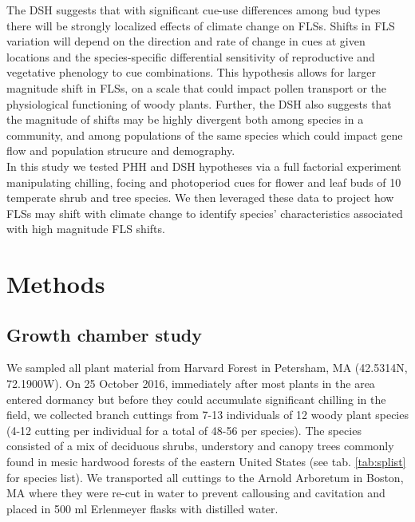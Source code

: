 \documentclass[11pt]{article}\usepackage[]{graphicx}\usepackage[]{color}
\begin{document}
\noindent The DSH suggests that with significant cue-use differences among bud types there will be strongly localized effects of climate change on FLSs. Shifts in FLS variation will depend on the direction and rate of change in cues at given locations and the species-specific differential sensitivity of reproductive and vegetative phenology to cue combinations. This hypothesis allows for larger magnitude shift in FLSs, on a scale that could impact pollen transport or the physiological functioning of woody plants. Further, the DSH also suggests that the magnitude of shifts may be highly divergent both among species in a community, and among populations of the same species which could impact gene flow and population strucure and demography.\\

\noindent In this study we tested PHH and DSH hypotheses via a full factorial experiment manipulating chilling, focing and photoperiod cues for flower and leaf buds of 10 temperate shrub and tree species. We then leveraged these data to project how FLSs may shift with climate change to identify species' characteristics associated with high magnitude FLS shifts.\\

\section*{Methods}

\subsection*{Growth chamber study}

\noindent We sampled all plant material from Harvard Forest in Petersham, MA (42.5314\degree N, 72.1900\degree W). On 25 October 2016, immediately after most plants in the area entered dormancy but before they could accumulate significant chilling in the field,  we collected branch cuttings from 7-13 individuals of 12 woody plant species (4-12 cutting per individual for a total of 48-56 per species). The species consisted of a mix of deciduous shrubs, understory and canopy trees commonly found in mesic hardwood forests of the eastern United States (see tab. \ref{tab:splist} for species list). We transported all cuttings to the Arnold Arboretum in Boston, MA where they were re-cut in water to prevent callousing and cavitation and placed in 500 ml Erlenmeyer flasks with distilled water.\\ 
\end{document}
